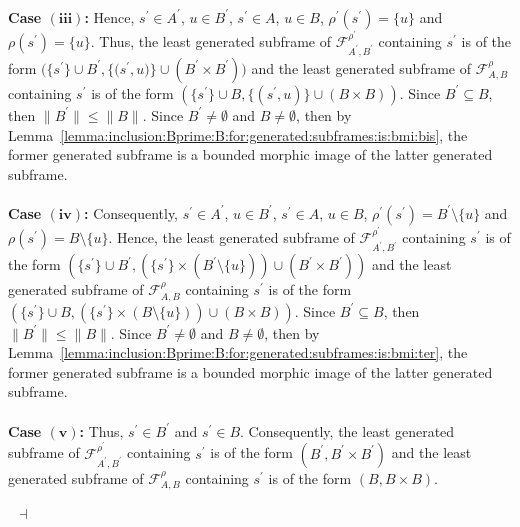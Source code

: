 \documentclass[draft]{article}
\newenvironment{proof}{{\bf Proof:}}{~$\dashv$\\}
\begin{document}
\begin{proof}
\\
%
%
{\bf Case $\mathbf{(iii)}$:}
Hence, $s^{\prime}{\in}A^{\prime}$, $u{\in}B^{\prime}$, $s^{\prime}{\in}A$, $u{\in}B$, $\rho^{\prime}(s^{\prime}){=}\{u\}$ and $\rho(s^{\prime}){=}\{u\}$.
Thus, the least generated subframe of ${\mathcal F}_{A^{\prime},B^{\prime}}^{\rho^{\prime}}$ containing $s^{\prime}$ is of the form $(\{s^{\prime}\}{\cup}B^{\prime},\{(s^{\prime},
%
%
%
%
%
%
%
%
%
%
%
%
$\linebreak$
%
%
%
%
%
%
%
%
%
%
%
%
u)\}{\cup}(B^{\prime}{\times}B^{\prime}))$ and the least generated subframe of ${\mathcal F}_{A,B}^{\rho}$ containing $s^{\prime}$ is of the form $(\{s^{\prime}\}{\cup}B,\{(s^{\prime},u)\}{\cup}(B{\times}B))$.
Since $B^{\prime}{\subseteq}B$, then ${\parallel}B^{\prime}{\parallel}{\leq}{\parallel}B{\parallel}$.
Since $B^{\prime}{\not=}\emptyset$ and $B{\not=}\emptyset$, then by Lemma~\ref{lemma:inclusion:Bprime:B:for:generated:subframes:is:bmi:bis}, the former generated subframe is a bounded morphic image of the latter generated subframe.
%
%
\\
\\
%
%
{\bf Case $\mathbf{(iv)}$:}
Consequently, $s^{\prime}{\in}A^{\prime}$, $u{\in}B^{\prime}$, $s^{\prime}{\in}A$, $u{\in}B$, $\rho^{\prime}(s^{\prime}){=}B^{\prime}{\setminus}\{u\}$ and $\rho(s^{\prime}){=}B
%
%
%
%
%
%
%
%
%
%
%
%
$\linebreak$
%
%
%
%
%
%
%
%
%
%
%
%
{\setminus}\{u\}$.
Hence, the least generated subframe of ${\mathcal F}_{A^{\prime},B^{\prime}}^{\rho^{\prime}}$ containing $s^{\prime}$ is of the form $(\{s^{\prime}\}{\cup}B^{\prime},(\{s^{\prime}\}{\times}(B^{\prime}{\setminus}\{u\})){\cup}(B^{\prime}{\times}B^{\prime}))$ and the least generated subframe of ${\mathcal F}_{A,B}^{\rho}$ containing $s^{\prime}$ is of the form $(\{s^{\prime}\}{\cup}B,(\{s^{\prime}\}{\times}(B{\setminus}\{u\})){\cup}(B{\times}B))$.
Since $B^{\prime}{\subseteq}B$, then ${\parallel}B^{\prime}{\parallel}{\leq}{\parallel}B{\parallel}$.
Since $B^{\prime}{\not=}\emptyset$ and $B{\not=}\emptyset$, then by Lemma~\ref{lemma:inclusion:Bprime:B:for:generated:subframes:is:bmi:ter}, the former generated subframe is a bounded morphic image of the latter generated subframe.
%
%
\\
\\
%
%
{\bf Case $\mathbf{(v)}$:}
Thus, $s^{\prime}{\in}B^{\prime}$ and $s^{\prime}{\in}B$.
Consequently, the least generated subframe of ${\mathcal F}_{A^{\prime},B^{\prime}}^{\rho^{\prime}}$ containing $s^{\prime}$ is of the form $(B^{\prime},B^{\prime}{\times}B^{\prime})$ and the least generated subframe of ${\mathcal F}_{A,B}^{\rho}$ containing $s^{\prime}$ is of the form $(B,B{\times}B)$.

\end{proof}
\end{document}
